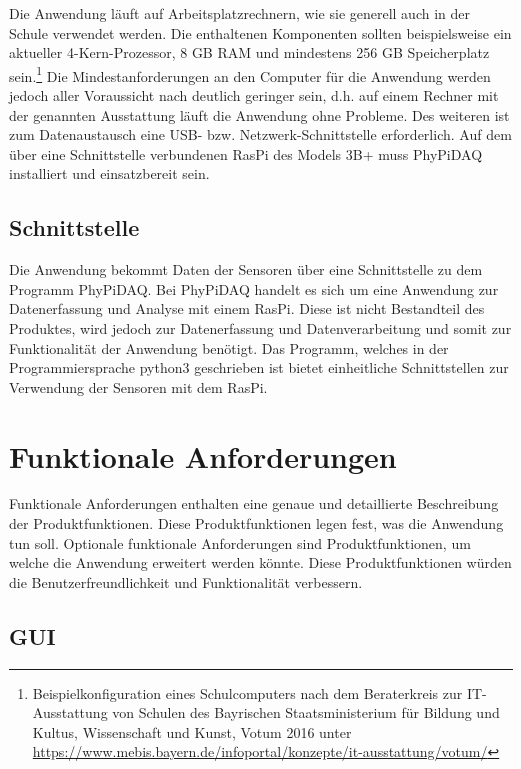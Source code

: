 \documentclass[parskip=full]{scrartcl}
\begin{document}
Die Anwendung läuft auf Arbeitsplatzrechnern, wie sie generell auch in der Schule verwendet werden.
Die enthaltenen Komponenten sollten beispielsweise ein aktueller 4-Kern-Prozessor, 8 GB RAM und
mindestens 256 GB Speicherplatz sein.\footnote{Beispielkonfiguration eines Schulcomputers nach dem Beraterkreis zur IT-Ausstattung von Schulen des Bayrischen Staatsministerium für Bildung und Kultus, Wissenschaft und Kunst, Votum 2016 unter \url{https://www.mebis.bayern.de/infoportal/konzepte/it-ausstattung/votum/}} Die Mindestanforderungen an den Computer für die Anwendung werden jedoch aller Voraussicht nach deutlich geringer sein, d.h. auf einem Rechner mit der genannten Ausstattung läuft  die Anwendung ohne Probleme. Des weiteren ist zum Datenaustausch eine USB- bzw. Netzwerk-Schnittstelle erforderlich. 
Auf dem über eine Schnittstelle verbundenen \gls{RasPi} des Models 3B+ muss \gls{PhyPiDAQ} installiert und einsatzbereit sein.

\subsection{Schnittstelle}

Die Anwendung bekommt Daten der Sensoren über eine Schnittstelle zu dem Programm PhyPiDAQ.
Bei PhyPiDAQ handelt es sich um eine Anwendung zur Datenerfassung und Analyse mit einem \gls{RasPi}. Diese ist nicht Bestandteil des Produktes, wird jedoch zur Datenerfassung und Datenverarbeitung und somit zur Funktionalität der Anwendung  benötigt. Das Programm, welches in der Programmiersprache \gls{python3} geschrieben ist bietet einheitliche Schnittstellen zur Verwendung der Sensoren mit dem \gls{RasPi}.

\clearpage
\section{Funktionale Anforderungen}\label{funktionale}

Funktionale Anforderungen enthalten eine genaue und detaillierte Beschreibung der Produktfunktionen. Diese Produktfunktionen legen fest, was die Anwendung tun soll. Optionale funktionale Anforderungen sind Produktfunktionen, um welche die Anwendung erweitert werden könnte. Diese Produktfunktionen würden die Benutzerfreundlichkeit und Funktionalität verbessern.


\subsection{GUI} %
\end{document}
